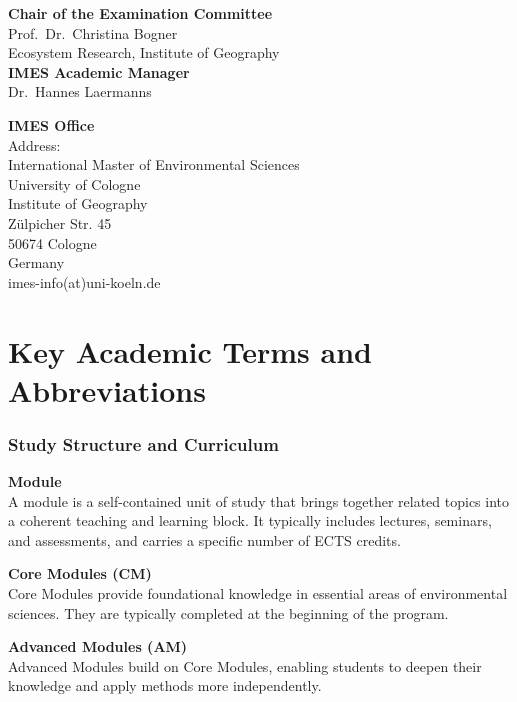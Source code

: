 \documentclass[
  letterpaper,
  10pt,
  openany]{book}
\begin{document}

\textbf{Chair of the Examination Committee}\\
Prof.~Dr.~Christina Bogner\\
Ecosystem Research, Institute of Geography\\

\textbf{IMES Academic Manager}\\
Dr.~Hannes Laermanns

\textbf{IMES Office}\\
Address:\\
International Master of Environmental Sciences\\
University of Cologne\\
Institute of Geography\\
Zülpicher Str. 45\\
50674 Cologne\\
Germany\\
imes-info(at)uni-koeln.de


\chapter*{Key Academic Terms and Abbreviations}\label{sec-concepts}


\subsection*{Study Structure and
Curriculum}\label{study-structure-and-curriculum}

\textbf{Module}\\
A module is a self-contained unit of study that brings together related
topics into a coherent teaching and learning block. It typically
includes lectures, seminars, and assessments, and carries a specific
number of ECTS credits.

\textbf{Core Modules (CM)}\\
Core Modules provide foundational knowledge in essential areas of
environmental sciences. They are typically completed at the beginning of
the program.

\textbf{Advanced Modules (AM)}\\
Advanced Modules build on Core Modules, enabling students to deepen
their knowledge and apply methods more independently.
\end{document}
